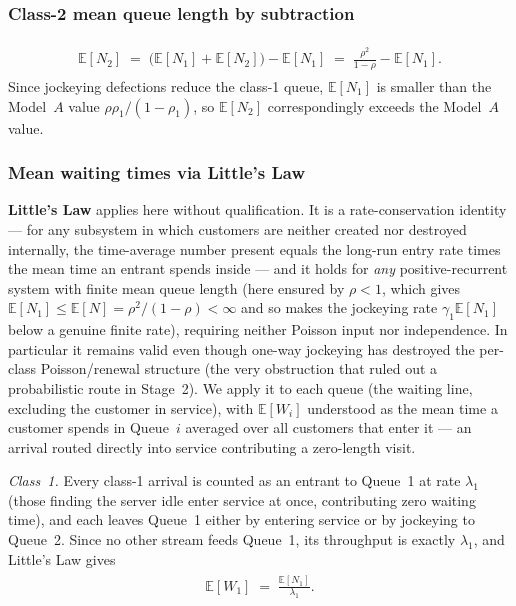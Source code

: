\subsubsection*{Class-2 mean queue length by subtraction}

\begin{align}
    \begin{split}
        \mathbb{E}[N_2]
        \;=\; \bigl(\mathbb{E}[N_1]+\mathbb{E}[N_2]\bigr)-\mathbb{E}[N_1]
        \;=\; \frac{\rho^2}{1-\rho}-\mathbb{E}[N_1].
    \end{split}
    \label{eq:B2:EN2}
\end{align}
Since jockeying defections reduce the class-1 queue,
$\mathbb{E}[N_1]$ is smaller than the Model~$A$ value $\rho\rho_1/(1-\rho_1)$,
so $\mathbb{E}[N_2]$ correspondingly exceeds the Model~$A$ value.

\subsubsection*{Mean waiting times via Little's Law}

\textbf{Little's Law} applies here without qualification. It is a rate-conservation
identity --- for any subsystem in which customers are neither created nor destroyed
internally, the time-average number present equals the long-run entry rate times the mean
time an entrant spends inside --- and it holds for \emph{any} positive-recurrent system with
finite mean queue length (here ensured by $\rho<1$, which gives
$\mathbb{E}[N_1]\le\mathbb{E}[N]=\rho^2/(1-\rho)<\infty$ and so makes the jockeying rate
$\gamma_1\mathbb{E}[N_1]$ below a genuine finite rate), requiring neither Poisson input nor
independence. In particular it remains valid even
though one-way jockeying has destroyed the per-class Poisson/renewal structure (the very
obstruction that ruled out a probabilistic route in Stage~2). We apply it to each queue
(the waiting line, excluding the customer in service), with $\mathbb{E}[W_i]$ understood as
the mean time a customer spends in Queue~$i$ averaged over all customers that enter it ---
an arrival routed directly into service contributing a zero-length visit.

\emph{Class~1.} Every class-1 arrival is counted as an entrant to Queue~1 at rate
$\lambda_1$ (those finding the server idle enter service at once, contributing zero waiting
time), and each leaves Queue~1 either by entering service or by jockeying to Queue~2. Since
no other stream feeds Queue~1, its throughput is exactly $\lambda_1$, and Little's Law gives
\begin{align}
    \begin{split}
        \mathbb{E}[W_1] \;=\; \frac{\mathbb{E}[N_1]}{\lambda_1}.
    \end{split}
    \label{eq:B2:EW}
\end{align}

